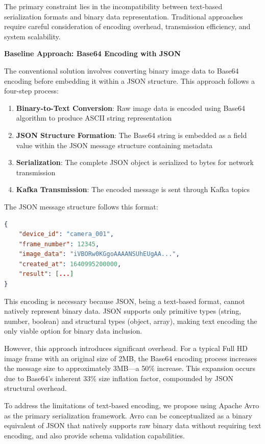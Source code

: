 The primary constraint lies in the incompatibility between text-based serialization formats and binary data representation. Traditional approaches require careful consideration of encoding overhead, transmission efficiency, and system scalability.

\textbf{Baseline Approach: Base64 Encoding with JSON}

The conventional solution involves converting binary image data to Base64 encoding before embedding it within a JSON structure. This approach follows a four-step process:

\begin{enumerate}
    \item \textbf{Binary-to-Text Conversion}: Raw image data is encoded using Base64 algorithm to produce ASCII string representation
    \item \textbf{JSON Structure Formation}: The Base64 string is embedded as a field value within the JSON message structure containing metadata
    \item \textbf{Serialization}: The complete JSON object is serialized to bytes for network transmission
    \item \textbf{Kafka Transmission}: The encoded message is sent through Kafka topics
\end{enumerate}

The JSON message structure follows this format:

\begin{lstlisting}[language=json, caption={JSON message structure with Base64 encoded image data}]
{
    "device_id": "camera_001",
    "frame_number": 12345,
    "image_data": "iVBORw0KGgoAAAANSUhEUgAA...",
    "created_at": 1640995200000,
    "result": [...]
}
\end{lstlisting}

This encoding is necessary because JSON, being a text-based format, cannot natively represent binary data. JSON supports only primitive types (string, number, boolean) and structural types (object, array), making text encoding the only viable option for binary data inclusion.

However, this approach introduces significant overhead. For a typical Full HD image frame with an original size of 2MB, the Base64 encoding process increases the message size to approximately 3MB—a 50\% increase. This expansion occurs due to Base64's inherent 33\% size inflation factor, compounded by JSON structural overhead.


To address the limitations of text-based encoding, we propose using Apache Avro as the primary serialization framework. Avro can be conceptualized as a binary equivalent of JSON that natively supports raw binary data without requiring text encoding, and also provide schema validation capabilities.


